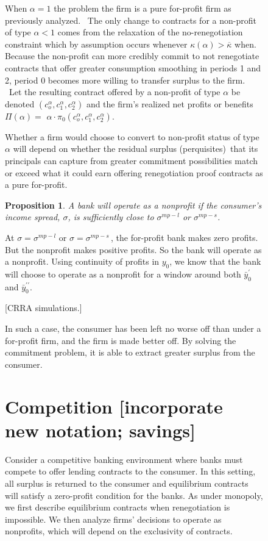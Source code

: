 \documentclass[11pt]{article}%
\newtheorem{proposition}{Proposition}
\begin{document}
\begin{figure}
{When $\alpha=1$ the problem the firm is a pure for-profit firm as previously
analyzed. \ The only change to contracts for a non-profit of type $\alpha<1$
comes from the relaxation of the no-renegotiation constraint which by
assumption occurs whenever $\kappa(\alpha)>\overline{\kappa}$ when. Because
the non-profit can more credibly commit to not renegotiate contracts that
offer greater consumption smoothing in periods 1 and 2, period 0 becomes more
willing to transfer surplus to the firm. \ Let the resulting contract offered
by a non-profit of type $\alpha$ be denoted $\left(  c_{o}^{\alpha}%
,c_{1}^{\alpha},c_{2}^{\alpha}\right)  $ and the firm's realized net profits
or benefits $\Pi(\alpha)=$ $\alpha\cdot\pi_{0}\left(  c_{o}^{\alpha}%
,c_{1}^{\alpha},c_{2}^{\alpha}\right)  .$

Whether a firm would choose to convert to non-profit status of type $\alpha$
will depend on whether the residual surplus (perquisites)\ that its principals
can capture from greater commitment possibilities match or exceed what it
could earn offering renegotiation proof contracts as a pure for-profit.

\begin{proposition}
A bank will operate as a nonprofit if the consumer's income spread, $\sigma$,
is sufficiently close to $\sigma^{mp-l}$ or $\sigma^{mp-s}$.
\end{proposition}

At $\sigma=\sigma^{mp-l}$ or $\sigma=\sigma^{mp-s}\,$, the for-profit bank
makes zero profits. But the nonprofit makes positive profits. So the bank will
operate as a nonprofit. Using continuity of profits in $y_{0}$, we know that
the bank will choose to operate as a nonprofit for a window around both
$\bar{y}_{0}^{\prime}$ and $\bar{y}_{0}^{\prime\prime}$.

[CRRA simulations.]

In such a case, the consumer has been left no worse off than under a
for-profit firm, and the firm is made better off. By solving the commitment
problem, it is able to extract greater surplus from the consumer.

\section{Competition [incorporate new notation; savings]}

Consider a competitive banking environment where banks must compete to offer
lending contracts to the consumer. In this setting, all surplus is returned to
the consumer and equilibrium contracts will satisfy a zero-profit condition
for the banks. As under monopoly, we first describe equilibrium contracts when
renegotiation is impossible. We then analyze firms' decisions to operate as
nonprofits, which will depend on the exclusivity of contracts.

}
\end{figure}
\end{document}
